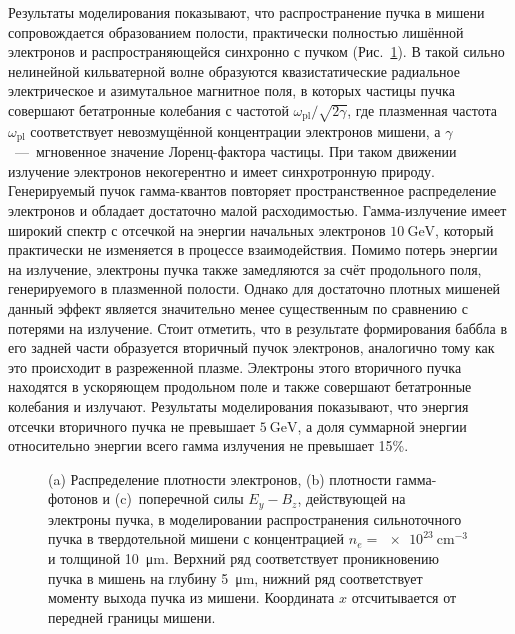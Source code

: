 Результаты моделирования показывают, что распространение пучка в мишени сопровождается образованием полости, практически полностью лишённой электронов и распространяющейся синхронно с пучком (Рис.~\ref{fig:ch3/bubble}).
В такой сильно нелинейной кильватерной волне образуются квазистатические радиальное электрическое и азимутальное магнитное поля, в которых частицы пучка совершают бетатронные колебания с частотой $\omega_\mathrm{pl} / \sqrt{2\gamma}$, где плазменная частота $\omega_\mathrm{pl}$ соответствует невозмущённой концентрации электронов мишени, а $\gamma$~---~мгновенное значение Лоренц-фактора частицы.
При таком движении излучение электронов некогерентно и имеет синхротронную природу.
Генерируемый пучок гамма-квантов повторяет пространственное распределение электронов и обладает достаточно малой расходимостью.
Гамма-излучение имеет широкий спектр с отсечкой на энергии начальных электронов $\SI{10}{\giga\electronvolt}$, который практически не изменяется в процессе взаимодействия.
Помимо потерь энергии на излучение, электроны пучка также замедляются за счёт продольного поля, генерируемого в плазменной полости.
Однако для достаточно плотных мишеней данный эффект является значительно менее существенным по сравнению с потерями на излучение.
Стоит отметить, что в результате формирования баббла в его задней части образуется вторичный пучок электронов, аналогично тому как это происходит в разреженной плазме.
Электроны этого вторичного пучка находятся в ускоряющем продольном поле и также совершают бетатронные колебания и излучают.
Результаты моделирования показывают, что энергия отсечки вторичного пучка не превышает $\SI{5}{\giga\electronvolt}$, а доля суммарной энергии относительно энергии всего гамма излучения не превышает 15\%.

\begin{figure}
    \caption[Распределение плотности электронов, плотности гамма-фотонов и поперечной силы, действующей на электроны пучка, в моделировании процесса распространения сильноточного пучка в твердотельной мишени]{\label{fig:ch3/bubble} (a) Распределение плотности электронов, (b) плотности гамма-фотонов и (c)~поперечной силы ${E_y - B_z}$, действующей на электроны пучка, в моделировании распространения сильноточного пучка в твердотельной мишени с концентрацией ${n_e=\SI{e23}{\centi\meter^{-3}}}$ и толщиной \SI{10}{\um}. Верхний ряд соответствует проникновению пучка в мишень на глубину \SI{5}{\um}, нижний ряд соответствует моменту выхода пучка из мишени. Координата $x$ отсчитывается от передней границы мишени.}
\end{figure}

